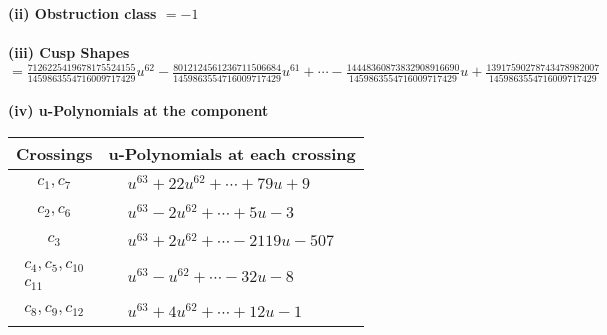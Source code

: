 \documentclass[1p]{elsarticle_modified}
\theoremstyle{definition}
\begin{document}
\flushleft \textbf{(ii) Obstruction class $= -1$}\\~\\
\flushleft \textbf{(iii) Cusp Shapes $= \frac{7126225419678175524155}{1459863554716009717429} u^{62}-\frac{8012124561236711506684}{1459863554716009717429} u^{61}+\cdots-\frac{14448360873832908916690}{1459863554716009717429} u+\frac{13917590278743478982007}{1459863554716009717429}$}\\~\\
\newpage\renewcommand{\arraystretch}{1}
\flushleft \textbf{(iv) u-Polynomials at the component}\newline \\
\begin{tabular}{m{50pt}|m{274pt}}
Crossings & \hspace{64pt}u-Polynomials at each crossing \\
\hline $$\begin{aligned}c_{1},c_{7}\end{aligned}$$&$\begin{aligned}
&u^{63}+22 u^{62}+\cdots+79 u+9
\end{aligned}$\\
\hline $$\begin{aligned}c_{2},c_{6}\end{aligned}$$&$\begin{aligned}
&u^{63}-2 u^{62}+\cdots+5 u-3
\end{aligned}$\\
\hline $$\begin{aligned}c_{3}\end{aligned}$$&$\begin{aligned}
&u^{63}+2 u^{62}+\cdots-2119 u-507
\end{aligned}$\\
\hline $$\begin{aligned}c_{4},c_{5},c_{10}\\c_{11}\end{aligned}$$&$\begin{aligned}
&u^{63}- u^{62}+\cdots-32 u-8
\end{aligned}$\\
\hline $$\begin{aligned}c_{8},c_{9},c_{12}\end{aligned}$$&$\begin{aligned}
&u^{63}+4 u^{62}+\cdots+12 u-1
\end{aligned}$\\
\hline
\end{tabular}\\~\\
\end{document}
